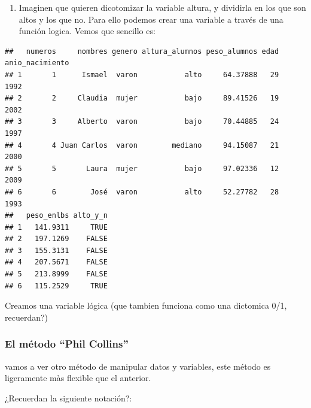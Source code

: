 \documentclass[
]{book}
\newenvironment{Shaded}{\begin{snugshade}}{\end{snugshade}}
\newcommand{\FunctionTok}[1]{\textcolor[rgb]{0.00,0.00,0.00}{#1}}
\newcommand{\NormalTok}[1]{#1}
\newcommand{\OtherTok}[1]{\textcolor[rgb]{0.56,0.35,0.01}{#1}}
\newcommand{\SpecialCharTok}[1]{\textcolor[rgb]{0.00,0.00,0.00}{#1}}
\newcommand{\StringTok}[1]{\textcolor[rgb]{0.31,0.60,0.02}{#1}}
\providecommand{\tightlist}{%
  \setlength{\itemsep}{0pt}\setlength{\parskip}{0pt}}
\begin{document}
\begin{enumerate}
\def\labelenumi{\arabic{enumi}.}
\setcounter{enumi}{2}
\tightlist
\item
  Imaginen que quieren dicotomizar la variable altura, y dividirla en los que son altos y los que no. Para ello podemos crear una variable a través de una función logica. Vemos que sencillo es:
\end{enumerate}

\begin{Shaded}
\end{Shaded}

\begin{verbatim}
##   numeros     nombres genero altura_alumnos peso_alumnos edad anio_nacimiento
## 1       1      Ismael  varon           alto     64.37888   29            1992
## 2       2     Claudia  mujer           bajo     89.41526   19            2002
## 3       3     Alberto  varon           bajo     70.44885   24            1997
## 4       4 Juan Carlos  varon        mediano     94.15087   21            2000
## 5       5       Laura  mujer           bajo     97.02336   12            2009
## 6       6        José  varon           alto     52.27782   28            1993
##   peso_enlbs alto_y_n
## 1   141.9311     TRUE
## 2   197.1269    FALSE
## 3   155.3131    FALSE
## 4   207.5671    FALSE
## 5   213.8999    FALSE
## 6   115.2529     TRUE
\end{verbatim}

Creamos una variable lógica (que tambien funciona como una dictomica 0/1, recuerdan?)

\hypertarget{el-muxe9todo-phil-collins}{%
\subsubsection{El método ``Phil Collins''}\label{el-muxe9todo-phil-collins}}

vamos a ver otro método de manipular datos y variables, este método es ligeramente màs flexible que el anterior.

¿Recuerdan la siguiente notación?:
\end{document}
